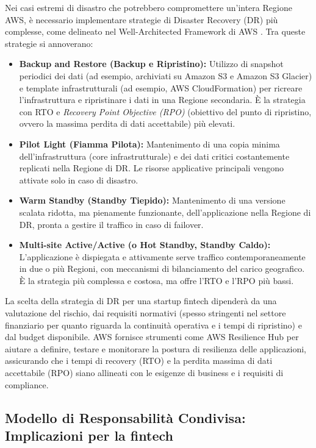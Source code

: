 Nei casi estremi di disastro che potrebbero compromettere un'intera Regione AWS, è necessario implementare strategie di Disaster Recovery (DR) più complesse, come delineato nel Well-Architected Framework di AWS \cite{awsWellArchitected}. Tra queste strategie si annoverano:
\begin{itemize}
    \item \textbf{Backup and Restore (Backup e Ripristino):} Utilizzo di snapshot periodici dei dati (ad esempio, archiviati su Amazon S3 e Amazon S3 Glacier) e template infrastrutturali (ad esempio, AWS CloudFormation) per ricreare l'infrastruttura e ripristinare i dati in una Regione secondaria. È la strategia con RTO e \textit{Recovery Point Objective (RPO)} (obiettivo del punto di ripristino, ovvero la massima perdita di dati accettabile) più elevati.
    \item \textbf{Pilot Light (Fiamma Pilota):} Mantenimento di una copia minima dell'infrastruttura (core infrastrutturale) e dei dati critici costantemente replicati nella Regione di DR. Le risorse applicative principali vengono attivate solo in caso di disastro.
    \item \textbf{Warm Standby (Standby Tiepido):} Mantenimento di una versione scalata ridotta, ma pienamente funzionante, dell'applicazione nella Regione di DR, pronta a gestire il traffico in caso di failover.
    \item \textbf{Multi-site Active/Active (o Hot Standby, Standby Caldo):} L'applicazione è dispiegata e attivamente serve traffico contemporaneamente in due o più Regioni, con meccanismi di bilanciamento del carico geografico. È la strategia più complessa e costosa, ma offre l'RTO e l'RPO più bassi.
\end{itemize}
La scelta della strategia di DR per una startup fintech dipenderà da una valutazione del rischio, dai requisiti normativi (spesso stringenti nel settore finanziario per quanto riguarda la continuità operativa e i tempi di ripristino) e dal budget disponibile. AWS fornisce strumenti come AWS Resilience Hub \cite{aws-resilience} per aiutare a definire, testare e monitorare la postura di resilienza delle applicazioni, assicurando che i tempi di recovery (RTO) e la perdita massima di dati accettabile (RPO) siano allineati con le esigenze di business e i requisiti di compliance.

\subsection{Modello di Responsabilità Condivisa: Implicazioni per la fintech}
\label{sec:shared-responsibility-fintech}

